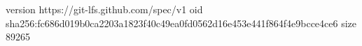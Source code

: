 version https://git-lfs.github.com/spec/v1
oid sha256:fc686d019b0ca2203a1823f40c49ea0fd0562d16e453e441f864f4e9bcce4ce6
size 89265
